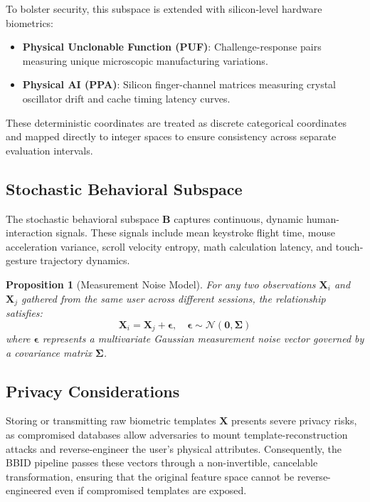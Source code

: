 \documentclass[11pt,twoside]{amsart}
\theoremstyle{plain}
\newtheorem{proposition}[theorem]{Proposition}
\theoremstyle{definition}
\theoremstyle{remark}
\newcommand{\bX}{\mathbf{X}}
\newcommand{\bB}{\mathbf{B}}
\newcommand{\bepsilon}{\boldsymbol{\epsilon}}
\newcommand{\bSigma}{\boldsymbol{\Sigma}}
\newcommand{\calN}{\mathcal{N}}
\begin{document}
To bolster security, this subspace is extended with silicon-level hardware biometrics:
\begin{itemize}
    \item \textbf{Physical Unclonable Function (PUF)}: Challenge-response pairs measuring unique microscopic manufacturing variations.
    \item \textbf{Physical AI (PPA)}: Silicon finger-channel matrices measuring crystal oscillator drift and cache timing latency curves.
\end{itemize}

These deterministic coordinates are treated as discrete categorical coordinates and mapped directly to integer spaces to ensure consistency across separate evaluation intervals.

\subsection{Stochastic Behavioral Subspace}

The stochastic behavioral subspace $\bB$ captures continuous, dynamic human-interaction signals. These signals include mean keystroke flight time, mouse acceleration variance, scroll velocity entropy, math calculation latency, and touch-gesture trajectory dynamics.

\begin{proposition}[Measurement Noise Model]
\label{prop:noise}
For any two observations $\bX_i$ and $\bX_j$ gathered from the same user across different sessions, the relationship satisfies:
\begin{equation}
\bX_i = \bX_j + \bepsilon, \quad \bepsilon \sim \calN(\mathbf{0}, \bSigma)
\end{equation}
where $\bepsilon$ represents a multivariate Gaussian measurement noise vector governed by a covariance matrix $\bSigma$.
\end{proposition}

\subsection{Privacy Considerations}

Storing or transmitting raw biometric templates $\bX$ presents severe privacy risks, as compromised databases allow adversaries to mount template-reconstruction attacks and reverse-engineer the user's physical attributes. Consequently, the BBID pipeline passes these vectors through a non-invertible, cancelable transformation, ensuring that the original feature space cannot be reverse-engineered even if compromised templates are exposed.
\end{document}
